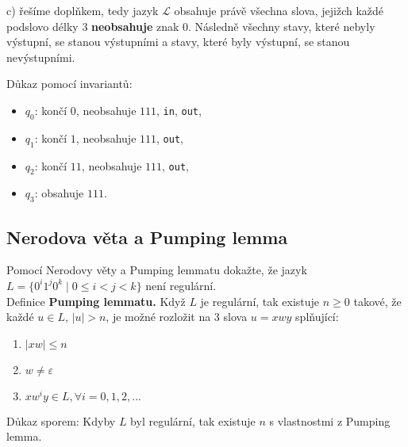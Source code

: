 c) řešíme doplňkem, tedy jazyk $\mathcal{L}$ obsahuje právě všechna slova, jejižch každé podslovo délky $3$ \textbf{neobsahuje}
znak $0$. Následně všechny stavy, které nebyly výstupní, se stanou výstupními a stavy, které byly výstupní, se stanou
nevýstupními.


Důkaz pomocí invariantů:
\begin{itemize}[noitemsep]
    \item $q_0$: končí $0$, neobsahuje $111$, \texttt{in}, \texttt{out},
    \item $q_1$: končí $1$, neobsahuje $111$, \texttt{out},
    \item $q_2$: končí $11$, neobsahuje $111$, \texttt{out},
    \item $q_3$: obsahuje $111$.
\end{itemize}

\newpage

\subsection{Nerodova věta a Pumping lemma}
Pomocí Nerodovy věty a Pumping lemmatu dokažte, že jazyk $L = \{0^i 1^j 0^k \mid 0 \leq i < j <k\}$ není regulární.\\

\noindent
Definice \textbf{Pumping lemmatu.} Když $L$ je regulární, tak existuje $n \geq 0$ takové, že každé ${u \in L}$,
$|u| > n$, je možné rozložit na 3 slova $u = xwy$ splňující:

\begin{enumerate}[1), noitemsep]
    \item $|xw| \leq n$
    \item $w \not= \varepsilon$
    \item $xw^i y \in L, \forall i = 0, 1, 2, ...$
\end{enumerate}
Důkaz sporem:
Kdyby $L$ byl regulární, tak existuje $n$ s vlastnostmi z Pumping lemma.


